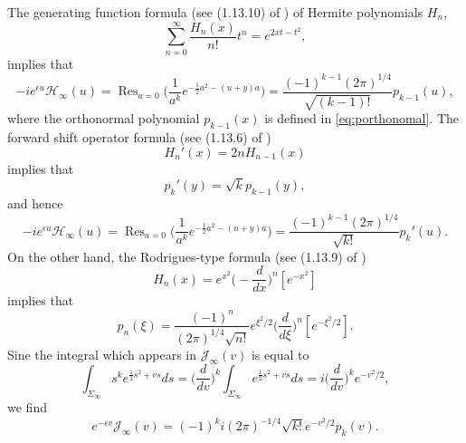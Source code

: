\documentclass[11pt]{article}
\DeclareMathOperator{\Res}{Res}
\begin{document}
The generating function formula (see (1.13.10) of \cite{Koekoek})
of Hermite polynomials $H_n$,
\begin{equation}
  \sum_{n=0}^\infty \frac{H_n(x)}{n!} t^n = e^{2xt-t^2},
\end{equation}
implies that
\begin{equation}
  -ie^{\epsilon u} \mathcal{H}_\infty(u)=
  \displaystyle \Res_{a=0}
  \biggl( \frac1{a^k} e^{-\frac12 a^2-(u+y)a} \biggr)
  = \frac{(-1)^{k-1}(2\pi)^{1/4}}{\sqrt{(k-1)!}} p_{k-1}(u),
\end{equation}
where the orthonormal polynomial $p_{k-1}(x)$ is defined in
\eqref{eq:porthonomal}. The forward shift operator formula (see
(1.13.6) of \cite{Koekoek})
\begin{equation}
  H_n'(x)=2nH_{n-1}(x)
\end{equation}
implies that
\begin{equation}\label{eq:Gaussforward}
  p_k'(y)= \sqrt{k}p_{k-1}(y),
\end{equation}
and hence
\begin{equation}\label{eq:Hp}
  -ie^{\epsilon u} \mathcal{H}_\infty(u)=
  \displaystyle \Res_{a=0}
  \biggl( \frac1{a^k} e^{-\frac12 a^2-(u+y)a} \biggr)
  = \frac{(-1)^{k-1}(2\pi)^{1/4}}{\sqrt{k!}} p_k'(u).
\end{equation}
On the other hand, the Rodrigues-type formula (see (1.13.9) of
\cite{Koekoek})
\begin{equation}
  H_n(x) = e^{x^2} \biggl( -\frac{d}{dx} \biggr)^n [e^{-x^2}]
\end{equation}
implies that
\begin{equation}
  p_n(\xi)= \frac{(-1)^n}{(2\pi)^{1/4}\sqrt{n!}} e^{\xi^2/2}
  \biggl( \frac{d}{d\xi} \biggr)^n [e^{-\xi^2/2}].
\end{equation}
Sine the integral which appears in $\mathcal{J}_\infty(v)$ is
equal to
\begin{equation}
  \int_{\Sigma_\infty} s^k e^{\frac12s^2+vs} ds
  = \biggl(\frac{d}{dv}\biggr)^k \int_{\Sigma_\infty}
  e^{\frac12s^2+vs} ds
  = i \biggl(\frac{d}{dv}\biggr)^k e^{-v^2/2},
\end{equation}
we find
\begin{equation}\label{eq:Jp}
  e^{-\epsilon v} \mathcal{J}_\infty(v)
  = (-1)^k i (2\pi)^{-1/4} \sqrt{k!}  e^{-v^2/2} p_k(v).
\end{equation}
\end{document}
